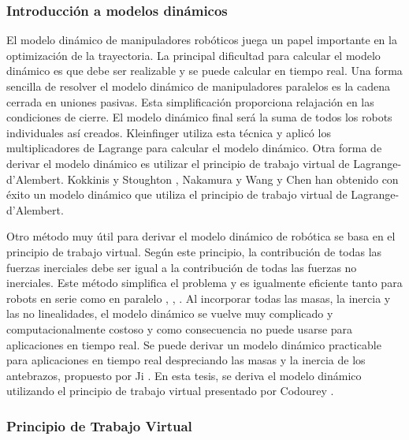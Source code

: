  
        
        \subsubsection{Introducción a modelos dinámicos}
    
        El modelo dinámico de manipuladores robóticos juega un papel importante en la optimización de la trayectoria. La principal dificultad para calcular el modelo dinámico es que debe ser realizable y se puede calcular en tiempo real. Una forma sencilla de resolver el modelo dinámico de manipuladores paralelos es la cadena cerrada en uniones pasivas. Esta simplificación proporciona relajación en las condiciones de cierre. El modelo dinámico final será la suma de todos los robots individuales así creados. Kleinfinger \cite{kleinfinger1986modelisation} utiliza esta técnica y aplicó los multiplicadores de Lagrange para calcular el modelo dinámico. Otra forma de derivar el modelo dinámico es utilizar el principio de trabajo virtual de Lagrange-d’Alembert. Kokkinis y Stoughton \cite{kokkinis1991dynamics}, Nakamura \cite{NakamuraYoshihiko1991Ar} y Wang y Chen \cite{wang1994dynamic} han obtenido con éxito un modelo dinámico que utiliza el principio de trabajo virtual de Lagrange-d’Alembert.
        
        Otro método muy útil para derivar el modelo dinámico de robótica se basa en el principio de trabajo virtual. Según este principio, la contribución de todas las fuerzas inerciales debe ser igual a la contribución de todas las fuerzas no inerciales. Este método simplifica el problema y es igualmente eficiente tanto para robots en serie como en paralelo \cite{Codourey:31400}, \cite{bodyoriente}, \cite{zhang1993efficient}. Al incorporar todas las masas, la inercia y las no linealidades, el modelo dinámico se vuelve muy complicado y computacionalmente costoso y como consecuencia no puede usarse para aplicaciones en tiempo real. Se puede derivar un modelo dinámico practicable para aplicaciones en tiempo real despreciando las masas y la inercia de los antebrazos, propuesto por Ji \cite{StudyinertiaStewart}. En esta tesis, se deriva el modelo dinámico utilizando el principio de trabajo virtual presentado por Codourey \cite{Codourey_decoupling}.      
        \newpage


        \subsubsection{Principio de Trabajo Virtual}

